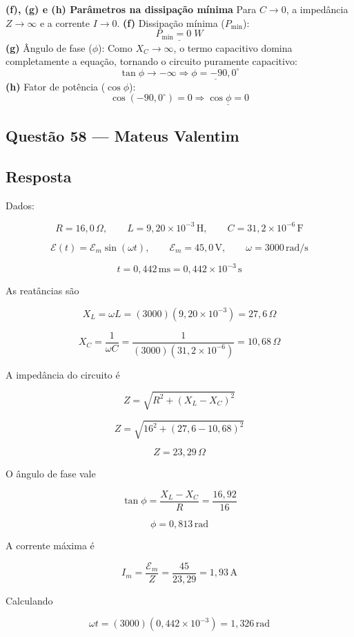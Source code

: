 \documentclass[12pt,a4paper]{article}
\begin{document}
\vspace{0.2cm}
\textbf{(f), (g) e (h) Parâmetros na dissipação mínima}
Para \(C \to 0\), a impedância \(Z \to \infty\) e a corrente \(I \to 0\).
\textbf{(f)} Dissipação mínima (\(P_{\min}\)):
\[\underline{P_{\min} = 0\;W}\]
\textbf{(g)} Ângulo de fase (\(\phi\)):
Como \(X_C \to \infty\), o termo capacitivo domina completamente a equação, tornando o circuito puramente capacitivo:
\[\tan\phi \to -\infty \Rightarrow \underline{\phi = -90,0^\circ}\]
\textbf{(h)} Fator de potência (\(\cos\phi\)):
\[\cos(-90,0^\circ) = 0 \Rightarrow \underline{\cos\phi = 0}\]

\subsection{Questão 58 — Mateus Valentim}
\subsection*{Resposta}

Dados:

\[
R = 16,0\,\Omega,
\qquad
L = 9,20\times10^{-3}\,\text{H},
\qquad
C = 31,2\times10^{-6}\,\text{F}
\]

\[
\mathcal{E}(t)=\mathcal{E}_m\sin(\omega t),
\qquad
\mathcal{E}_m=45,0\,\text{V},
\qquad
\omega=3000\,\text{rad/s}
\]

\[
t=0,442\,\text{ms}
=0,442\times10^{-3}\,\text{s}
\]

As reatâncias são

\[
X_L=\omega L
=(3000)(9,20\times10^{-3})
=27,6\,\Omega
\]

\[
X_C=\frac{1}{\omega C}
=
\frac{1}{(3000)(31,2\times10^{-6})}
=10,68\,\Omega
\]

A impedância do circuito é

\[
Z=\sqrt{R^2+(X_L-X_C)^2}
\]

\[
Z=\sqrt{16^2+(27,6-10,68)^2}
\]

\[
Z=23,29\,\Omega
\]

O ângulo de fase vale

\[
\tan\phi=
\frac{X_L-X_C}{R}
=
\frac{16,92}{16}
\]

\[
\phi=0,813\,\text{rad}
\]

A corrente máxima é

\[
I_m=\frac{\mathcal{E}_m}{Z}
=
\frac{45}{23,29}
=
1,93\,\text{A}
\]

Calculando

\[
\omega t
=
(3000)(0,442\times10^{-3})
=
1,326\,\text{rad}
\]
\end{document}
